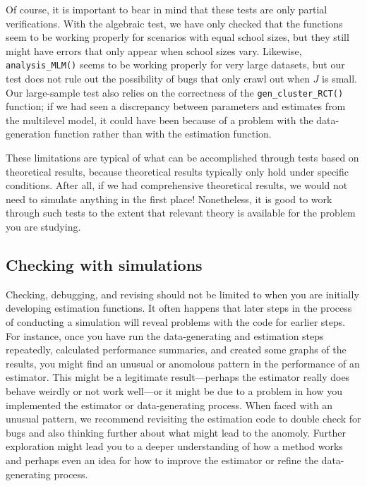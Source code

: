 \documentclass[
]{book}
\begin{document}
Of course, it is important to bear in mind that these tests are only partial verifications.
With the algebraic test, we have only checked that the functions seem to be working properly for scenarios with equal school sizes, but they still might have errors that only appear when school sizes vary.
Likewise, \texttt{analysis\_MLM()} seems to be working properly for very large datasets, but our test does not rule out the possibility of bugs that only crawl out when \(J\) is small.
Our large-sample test also relies on the correctness of the \texttt{gen\_cluster\_RCT()} function;
if we had seen a discrepancy between parameters and estimates from the multilevel model, it could have been because of a problem with the data-generation function rather than with the estimation function.

These limitations are typical of what can be accomplished through tests based on theoretical results, because theoretical results typically only hold under specific conditions.
After all, if we had comprehensive theoretical results, we would not need to simulate anything in the first place!
Nonetheless, it is good to work through such tests to the extent that relevant theory is available for the problem you are studying.

\subsection{Checking with simulations}\label{checking-with-simulations}

Checking, debugging, and revising should not be limited to when you are initially developing estimation functions.
It often happens that later steps in the process of conducting a simulation will reveal problems with the code for earlier steps.
For instance, once you have run the data-generating and estimation steps repeatedly, calculated performance summaries, and created some graphs of the results, you might find an unusual or anomolous pattern in the performance of an estimator.
This might be a legitimate result---perhaps the estimator really does behave weirdly or not work well---or it might be due to a problem in how you implemented the estimator or data-generating process.
When faced with an unusual pattern, we recommend revisiting the estimation code to double check for bugs and also thinking further about what might lead to the anomoly.
Further exploration might lead you to a deeper understanding of how a method works and perhaps even an idea for how to improve the estimator or refine the data-generating process.
\end{document}
